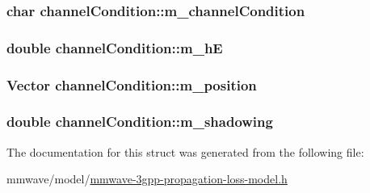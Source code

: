 \subsubsection[{\texorpdfstring{m\+\_\+channel\+Condition}{m_channelCondition}}]{\setlength{\rightskip}{0pt plus 5cm}char channel\+Condition\+::m\+\_\+channel\+Condition}\hypertarget{structchannelCondition_a1fbbec1a89c5da0961efaca304ade4d1}{}\label{structchannelCondition_a1fbbec1a89c5da0961efaca304ade4d1}
\subsubsection[{\texorpdfstring{m\+\_\+hE}{m_hE}}]{\setlength{\rightskip}{0pt plus 5cm}double channel\+Condition\+::m\+\_\+hE}\hypertarget{structchannelCondition_a6d2cc3deb0ce073a2b9a4d213e869985}{}\label{structchannelCondition_a6d2cc3deb0ce073a2b9a4d213e869985}
\subsubsection[{\texorpdfstring{m\+\_\+position}{m_position}}]{\setlength{\rightskip}{0pt plus 5cm}Vector channel\+Condition\+::m\+\_\+position}\hypertarget{structchannelCondition_a24eb519106a6796f4f2bebcd9ea2fc40}{}\label{structchannelCondition_a24eb519106a6796f4f2bebcd9ea2fc40}
\subsubsection[{\texorpdfstring{m\+\_\+shadowing}{m_shadowing}}]{\setlength{\rightskip}{0pt plus 5cm}double channel\+Condition\+::m\+\_\+shadowing}\hypertarget{structchannelCondition_abf42a510bc41e8eb84c96f9b47cc8f47}{}\label{structchannelCondition_abf42a510bc41e8eb84c96f9b47cc8f47}


The documentation for this struct was generated from the following file\+:\begin{DoxyCompactItemize}
\item 
mmwave/model/\hyperlink{mmwave-3gpp-propagation-loss-model_8h}{mmwave-\/3gpp-\/propagation-\/loss-\/model.\+h}\end{DoxyCompactItemize}
